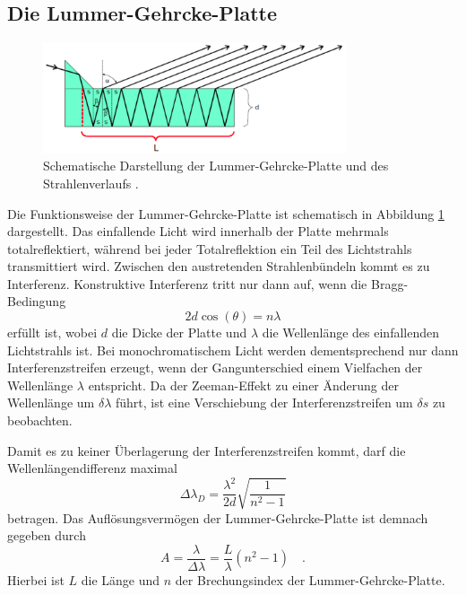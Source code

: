 \subsection*{Die Lummer-Gehrcke-Platte}
\FloatBarrier
\begin{figure}
\centering
\includegraphics[width=0.8\textwidth]{dieguteGehrke.png}
\caption{Schematische Darstellung der Lummer-Gehrcke-Platte und des Strahlenverlaufs \cite{quelle02}.}
\label{fig:tfig6}
\end{figure}
\FloatBarrier
Die Funktionsweise der Lummer-Gehrcke-Platte ist schematisch in Abbildung \ref{fig:tfig6} dargestellt. Das einfallende Licht wird innerhalb der Platte mehrmals totalreflektiert,
während bei jeder Totalreflektion ein Teil des Lichtstrahls transmittiert wird. Zwischen den austretenden Strahlenbündeln kommt es zu Interferenz. Konstruktive Interferenz tritt nur dann
auf, wenn die Bragg-Bedingung
\begin{equation}
2d \cos(\theta) = n \lambda
\end{equation}
erfüllt ist, wobei $d$ die Dicke der Platte und $\lambda$ die Wellenlänge des einfallenden Lichtstrahls ist.
Bei monochromatischem Licht werden dementsprechend nur dann Interferenzstreifen erzeugt, wenn der Gangunterschied einem Vielfachen der Wellenlänge $\lambda$ entspricht. Da der Zeeman-Effekt zu einer 
Änderung der Wellenlänge um $\delta \lambda$ führt, ist eine Verschiebung der Interferenzstreifen um $\delta s$ zu beobachten.

Damit es zu keiner Überlagerung der Interferenzstreifen kommt, darf die Wellenlängendifferenz maximal
\begin{equation}
    \label{eq:lambda_d}
\Delta \lambda_D = \frac{\lambda ^2}{2d}\sqrt{\frac{1}{n^2-1}}
\end{equation}
betragen. Das Auflösungsvermögen der Lummer-Gehrcke-Platte ist demnach gegeben durch
\begin{equation}
    \label{eq:a}
A = \frac{\lambda}{\Delta \lambda} = \frac{L}{\lambda}(n^2-1) \quad  .
\end{equation}
Hierbei ist $L$ die Länge und $n$ der Brechungsindex der Lummer-Gehrcke-Platte.


